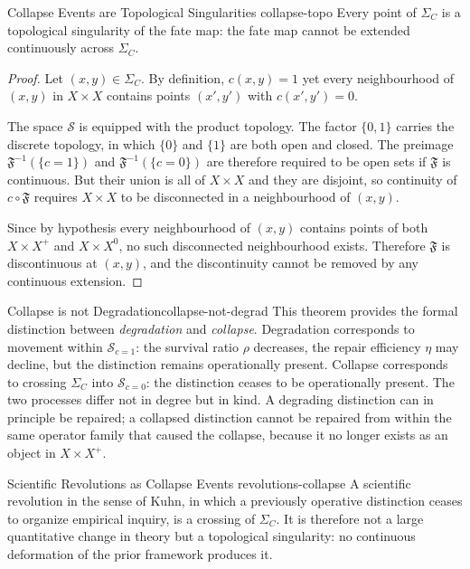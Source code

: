 \documentclass[12pt,twoside,openright]{book}
\newcommand{\distPairs}{X\times X}
\newcommand{\fateMap}{\mathfrak{F}}
\newcommand{\fateSpace}{\mathcal{S}}
\newcommand{\survRatio}{\rho}             %
\newcommand{\repEff}{\eta}               %
\newcommand{\collapseInd}{c}             %
\newcommand{\strataC}{\Sigma_{C}}   %
\newcommand{\fateComp}[1]{\fateSpace_{\collapseInd=#1}}
\providecommand{\strataC}{\Sigma_{C}}
\providecommand{\fateComp}[1]{\fateSpace_{\collapseInd=#1}}
\begin{document}
\begin{theorem}{Collapse Events are Topological Singularities}%
  {collapse-topo}
Every point of $\strataC$ is a topological singularity of the
fate map: the fate map cannot be extended continuously across
$\strataC$.
\begin{proof}
Let $(x,y)\in\strataC$. By definition, $\collapseInd(x,y)=1$
yet every neighbourhood of $(x,y)$ in $\distPairs$ contains
points $(x',y')$ with $\collapseInd(x',y')=0$.

The space $\fateSpace$ is equipped with the product topology.
The factor $\{0,1\}$ carries the discrete topology, in which
$\{0\}$ and $\{1\}$ are both open and closed. The preimage
$\fateMap^{-1}(\{c=1\})$ and $\fateMap^{-1}(\{c=0\})$ are
therefore required to be open sets if $\fateMap$ is continuous.
But their union is all of $\distPairs$ and they are disjoint,
so continuity of $\collapseInd\circ\fateMap$ requires
$\distPairs$ to be disconnected in a neighbourhood of $(x,y)$.

Since by hypothesis every neighbourhood of $(x,y)$ contains
points of both $\distPairs^+$ and $\distPairs^0$, no such
disconnected neighbourhood exists. Therefore $\fateMap$ is
discontinuous at $(x,y)$, and the discontinuity cannot be
removed by any continuous extension.
\end{proof}
\end{theorem}

\begin{remark}{Collapse is not Degradation}{collapse-not-degrad}
This theorem provides the formal distinction between
\emph{degradation} and \emph{collapse}. Degradation corresponds
to movement within $\fateComp{1}$: the survival ratio $\survRatio$
decreases, the repair efficiency $\repEff$ may decline, but the
distinction remains operationally present. Collapse corresponds
to crossing $\strataC$ into $\fateComp{0}$: the distinction
ceases to be operationally present. The two processes differ not
in degree but in kind. A degrading distinction can in principle
be repaired; a collapsed distinction cannot be repaired from
within the same operator family that caused the collapse,
because it no longer exists as an object in $\distPairs^+$.
\end{remark}

\begin{corollary}{Scientific Revolutions as Collapse Events}%
  {revolutions-collapse}
A scientific revolution in the sense of Kuhn, in which a
previously operative distinction ceases to organize empirical
inquiry, is a crossing of $\strataC$. It is therefore not a
large quantitative change in theory but a topological
singularity: no continuous deformation of the prior framework
produces it.
\end{corollary}
\end{document}
